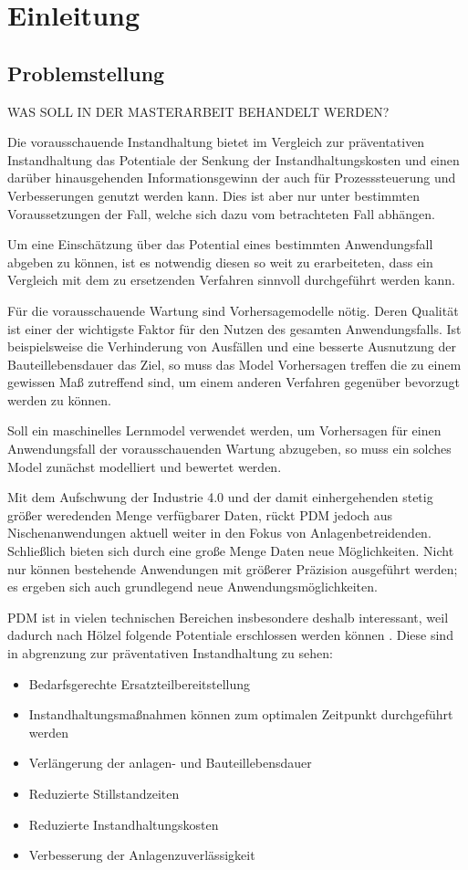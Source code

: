 \chapter{Einleitung}
\label{ch:einleitung}

\section{Problemstellung}
\label{sec:motivation}
WAS SOLL IN DER MASTERARBEIT BEHANDELT WERDEN?

Die vorausschauende Instandhaltung bietet im Vergleich zur präventativen Instandhaltung das Potentiale der Senkung der Instandhaltungskosten und einen darüber hinausgehenden Informationsgewinn der auch für Prozesssteuerung und Verbesserungen genutzt werden kann. Dies ist aber nur unter bestimmten Voraussetzungen der Fall, welche sich dazu vom betrachteten Fall abhängen.

Um eine Einschätzung über das Potential eines bestimmten Anwendungsfall abgeben zu können, ist es notwendig diesen so weit zu erarbeiteten, dass ein Vergleich mit dem zu ersetzenden Verfahren sinnvoll durchgeführt werden kann.

Für die vorausschauende Wartung sind Vorhersagemodelle nötig. Deren Qualität ist einer der wichtigste Faktor für den Nutzen des gesamten Anwendungsfalls. Ist beispielsweise die Verhinderung von Ausfällen und eine besserte Ausnutzung der Bauteillebensdauer das Ziel, so muss das Model Vorhersagen treffen die zu einem gewissen Maß zutreffend sind, um einem anderen Verfahren gegenüber bevorzugt werden zu können.

Soll ein maschinelles Lernmodel verwendet werden, um Vorhersagen für einen Anwendungsfall der vorausschauenden Wartung abzugeben, so muss ein solches Model zunächst modelliert und bewertet werden.


Mit dem Aufschwung der Industrie 4.0 und der damit einhergehenden stetig größer weredenden Menge verfügbarer Daten, rückt PDM jedoch aus Nischenanwendungen aktuell weiter in den Fokus von Anlagenbetreidenden. Schließlich bieten sich durch eine große Menge Daten neue Möglichkeiten. Nicht nur können bestehende Anwendungen mit größerer Präzision ausgeführt werden; es ergeben sich auch grundlegend neue Anwendungsmöglichkeiten. 

PDM ist in vielen technischen Bereichen insbesondere deshalb interessant, weil  dadurch nach Hölzel folgende Potentiale erschlossen werden können . Diese sind in abgrenzung zur präventativen Instandhaltung zu sehen:
\begin{itemize}
	\item Bedarfsgerechte Ersatzteilbereitstellung
	\item Instandhaltungsmaßnahmen können zum optimalen Zeitpunkt durchgeführt werden
	\item Verlängerung der anlagen- und Bauteillebensdauer
	\item Reduzierte Stillstandzeiten
	\item Reduzierte Instandhaltungskosten
	\item Verbesserung der Anlagenzuverlässigkeit
\end{itemize}

